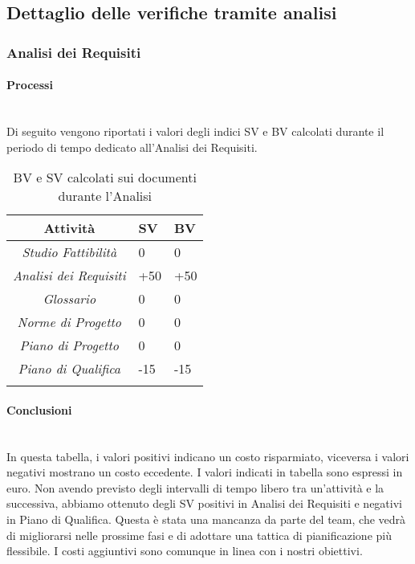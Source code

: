 \subsection{Dettaglio delle verifiche tramite analisi}
\subsubsection{Analisi dei Requisiti}
\paragraph{Processi} \hfill\\
Di seguito vengono riportati i valori degli indici SV e BV calcolati durante il periodo di tempo dedicato all'Analisi dei Requisiti.
\begin{longtable}{|c|p{3cm}|p{3cm}|}
\toprule
\textbf{Attività} & \textbf{SV} & \textbf{BV} \\


\midrule
\emph{Studio Fattibilità} & 0 & 0 \\
\midrule
\emph{Analisi dei Requisiti} & +50 & +50\\
\midrule
\emph{Glossario} & 0  & 0\\
\midrule
\emph{Norme di Progetto} & 0 & 0\\
\midrule
\emph{Piano di Progetto} & 0 & 0\\
\midrule
\emph{Piano di Qualifica} & -15 & -15\\
\bottomrule
\caption{BV e SV calcolati sui documenti durante l'Analisi}
\label{tab:changelog}
\end{longtable}

\paragraph{Conclusioni} \hfill\\
In questa tabella, i valori positivi indicano un costo risparmiato, viceversa i valori negativi mostrano un costo eccedente.
I valori indicati in tabella sono espressi in euro.
Non avendo previsto degli intervalli di tempo libero tra un'attività e la successiva, abbiamo ottenuto degli SV positivi in Analisi dei Requisiti e negativi in Piano di Qualifica.
Questa è stata una mancanza da parte del team, che vedrà di migliorarsi nelle prossime fasi e di adottare una tattica di pianificazione più flessibile.
I costi aggiuntivi sono comunque in linea con i nostri obiettivi.

